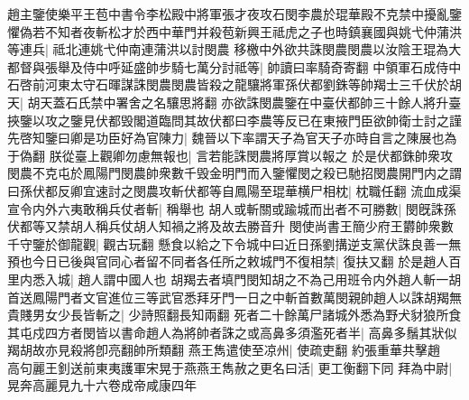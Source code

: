 趙主鑒使樂平王苞中書令李松殿中將軍張才夜攻石閔李農於琨華殿不克禁中擾亂鑒懼偽若不知者夜斬松才於西中華門并殺苞新興王祗虎之子也時鎮襄國與姚弋仲蒲洪等連兵|{
	祗北連姚弋仲南連蒲洪以討閔農}
移檄中外欲共誅閔農閔農以汝陰王琨為大都督與張舉及侍中呼延盛帥步騎七萬分討祗等|{
	帥讀曰率騎奇寄翻}
中領軍石成侍中石啓前河東太守石暉謀誅閔農閔農皆殺之龍驤將軍孫伏都劉銖等帥羯士三千伏於胡天|{
	胡天蓋石氏禁中署舍之名驤思將翻}
亦欲誅閔農鑒在中臺伏都帥三十餘人將升臺挾鑒以攻之鑒見伏都毁閣道臨問其故伏都曰李農等反已在東掖門臣欲帥衛士討之謹先啓知鑒曰卿是功臣好為官陳力|{
	魏晉以下率謂天子為官天子亦時自言之陳展也為于偽翻}
朕從臺上觀卿勿慮無報也|{
	言若能誅閔農將厚賞以報之}
於是伏都銖帥衆攻閔農不克屯於鳳陽門閔農帥衆數千毁金明門而入鑒懼閔之殺已馳招閔農開門内之謂曰孫伏都反卿宜速討之閔農攻斬伏都等自鳳陽至琨華横尸相枕|{
	枕職任翻}
流血成渠宣令内外六夷敢稱兵仗者斬|{
	稱舉也}
胡人或斬關或踰城而出者不可勝數|{
	閔旣誅孫伏都等又禁胡人稱兵仗胡人知禍之將及故去勝音升}
閔使尚書王簡少府王欝帥衆數千守鑒於御龍觀|{
	觀古玩翻}
懸食以給之下令城中曰近日孫劉搆逆支黨伏誅良善一無預也今日已後與官同心者留不同者各任所之敕城門不復相禁|{
	復扶又翻}
於是趙人百里内悉入城|{
	趙人謂中國人也}
胡羯去者填門閔知胡之不為己用班令内外趙人斬一胡首送鳳陽門者文官進位三等武官悉拜牙門一日之中斬首數萬閔親帥趙人以誅胡羯無貴賤男女少長皆斬之|{
	少詩照翻長知兩翻}
死者二十餘萬尸諸城外悉為野犬豺狼所食其屯戍四方者閔皆以書命趙人為將帥者誅之或高鼻多須濫死者半|{
	高鼻多鬚其狀似羯胡故亦見殺將卽亮翻帥所類翻}
燕王雋遣使至凉州|{
	使疏吏翻}
約張重華共擊趙　高句麗王釗送前東夷護軍宋晃于燕燕王雋赦之更名曰活|{
	更工衡翻下同}
拜為中尉|{
	晃奔高麗見九十六卷成帝咸康四年}


